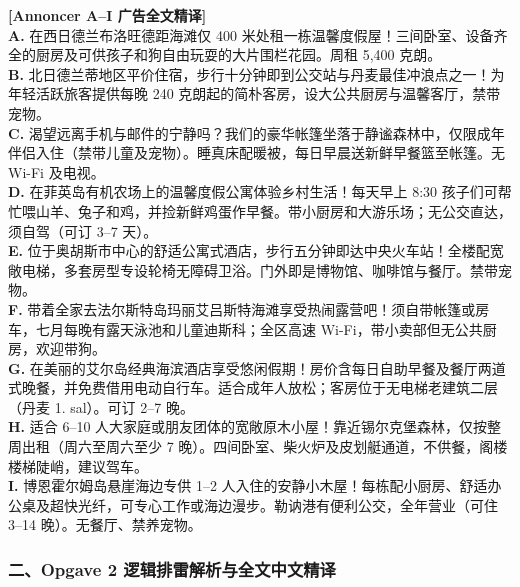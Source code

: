 \begin{transbox}
\small
\textbf{\color{NCDTeal}[Annoncer A--I 广告全文精译]}\\
\textbf{A.} 在西日德兰布洛旺德距海滩仅 400 米处租一栋温馨度假屋！三间卧室、设备齐全的厨房及可供孩子和狗自由玩耍的大片围栏花园。周租 5,400 克朗。\\
\textbf{B.} 北日德兰蒂地区平价住宿，步行十分钟即到公交站与丹麦最佳冲浪点之一！为年轻活跃旅客提供每晚 240 克朗起的简朴客房，设大公共厨房与温馨客厅，禁带宠物。\\
\textbf{C.} 渴望远离手机与邮件的宁静吗？我们的豪华帐篷坐落于静谧森林中，仅限成年伴侣入住（禁带儿童及宠物）。睡真床配暖被，每日早晨送新鲜早餐篮至帐篷。无 Wi-Fi 及电视。\\
\textbf{D.} 在菲英岛有机农场上的温馨度假公寓体验乡村生活！每天早上 8:30 孩子们可帮忙喂山羊、兔子和鸡，并捡新鲜鸡蛋作早餐。带小厨房和大游乐场；无公交直达，须自驾（可订 3--7 天）。\\
\textbf{E.} 位于奥胡斯市中心的舒适公寓式酒店，步行五分钟即达中央火车站！全楼配宽敞电梯，多套房型专设轮椅无障碍卫浴。门外即是博物馆、咖啡馆与餐厅。禁带宠物。\\
\textbf{F.} 带着全家去法尔斯特岛玛丽艾吕斯特海滩享受热闹露营吧！须自带帐篷或房车，七月每晚有露天泳池和儿童迪斯科；全区高速 Wi-Fi，带小卖部但无公共厨房，欢迎带狗。\\
\textbf{G.} 在美丽的艾尔岛经典海滨酒店享受悠闲假期！房价含每日自助早餐及餐厅两道式晚餐，并免费借用电动自行车。适合成年人放松；客房位于无电梯老建筑二层（丹麦 1. sal）。可订 2--7 晚。\\
\textbf{H.} 适合 6--10 人大家庭或朋友团体的宽敞原木小屋！靠近锡尔克堡森林，仅按整周出租（周六至周六至少 7 晚）。四间卧室、柴火炉及皮划艇通道，不供餐，阁楼楼梯陡峭，建议驾车。\\
\textbf{I.} 博恩霍尔姆岛悬崖海边专供 1--2 人入住的安静小木屋！每栋配小厨房、舒适办公桌及超快光纤，可专心工作或海边漫步。勒讷港有便利公交，全年营业（可住 3--14 晚）。无餐厅、禁养宠物。
\end{transbox}

\subsubsection*{二、Opgave 2 逻辑排雷解析与全文中文精译}

